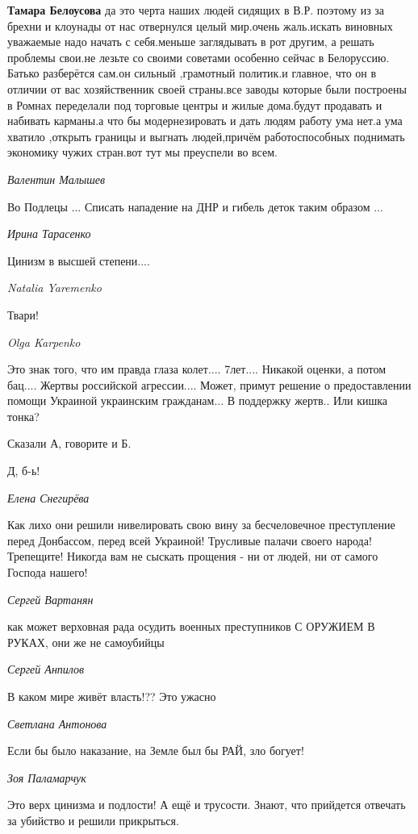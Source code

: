 \textbf{Тамара Белоусова} да это черта наших людей сидящих в В.Р. поэтому из за брехни и
клоунады от нас отвернулся целый мир.очень жаль.искать виновных уважаемые надо
начать с себя.меньше заглядывать в рот другим, а решать проблемы свои.не лезьте
со своими советами особенно сейчас в Белоруссию. Батько разберётся сам.он
сильный ,грамотный политик.и главное, что он в отличии от вас хозяйственник
своей страны.все заводы которые были построены в Ромнах переделали под торговые
центры и жилые дома.будут продавать и набивать карманы.а что бы модернезировать
и дать людям работу ума нет.а ума хватило ,открыть границы и выгнать
людей,причём работоспособных поднимать экономику чужих стран.вот тут мы
преуспели во всем.

\emph{Валентин Малышев}

Во Подлецы ... Списать нападение на ДНР и гибель деток таким образом ...

\emph{Ирина Тарасенко}

Цинизм в высшей степени....

\emph{Natalia Yaremenko}

Твари!

\emph{Olga Karpenko}

Это знак того, что им правда глаза колет.... 7лет.... Никакой оценки, а потом
бац.... Жертвы российской агрессии....  Может, примут решение о предоставлении
помощи Украиной украинским гражданам... В поддержку жертв..  Или кишка тонка?

Сказали А, говорите и Б.

Д, б-ь!

\emph{Елена Снегирёва}

Как лихо они решили нивелировать свою вину за бесчеловечное преступление перед
Донбассом, перед всей Украиной! Трусливые палачи своего народа! Трепещите!
Никогда вам не сыскать прощения - ни от людей, ни от самого Господа нашего!

\emph{Сергей Вартанян}

как может верховная рада осудить военных преступников С ОРУЖИЕМ В РУКАХ, они же не самоубийцы

\emph{Сергей Анпилов}

В каком мире живёт власть!?? Это ужасно

\emph{Светлана Антонова}

Если бы было наказание, на Земле был бы РАЙ, зло богует!

\emph{Зоя Паламарчук}

Это верх цинизма и подлости!  А ещё и трусости.  Знают, что прийдется отвечать
за убийство и решили прикрыться.

